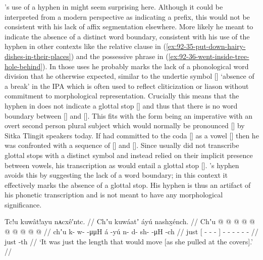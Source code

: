 \citeauthor{swanton:1909}’s use of a hyphen in  might seem surprising here.
Although it could be interpreted from a modern perspective as indicating a prefix, this would not be consistent with his lack of affix segmentation elsewhere.
More likely he meant to indicate the absence of a distinct word boundary, consistent with his use of the hyphen in other contexts like
the relative clause in (\ref{ex:92-35-put-down-hairy-dishes-in-their-places})
and
the possessive phrase in (\ref{ex:92-36-went-inside-tree-hole-behind}).
In those uses he probably marks the lack of a phonological word division that he otherwise expected, similar to the undertie symbol [] ‘absence of a break’ in the IPA \parencite[23]{international-phonetic-association:1999} which is often used to reflect cliticization or liason without commitment to morphological representation.
Crucially this means that the hyphen in  does not indicate a glottal stop [] and thus that there is no word boundary between [] and [].
This fits with the form being an imperative with an overt second person plural subject  which would normally be pronounced [] by Sitka Tlingit speakers today.
If \citeauthor{swanton:1909} had committed to the coda [] as a vowel [] then he was confronted with a sequence of [] and [].
Since \citeauthor{swanton:1909} usually did not transcribe glottal stops with a distinct symbol and instead relied on their implicit presence between vowels, his transcription as  would entail a glottal stop [].
\citeauthor{swanton:1909}’s hyphen avoids this by suggesting the lack of a word boundary;
in this context it effectively marks the absence of a glottal stop.
His hyphen is thus an artifact of his phonetic transcription and is not meant to have any morphological significance.

\ex\label{ex:92-41-length-would-move}%
%
\begingl
	\glpreamble	Tc!u kuwât!ayu nᴀcxê′ntc. //
	\glpreamble	Chʼu kuwáatʼ áyú nashx̱énch. //
	\gla	Chʼu {}  @ {} @ {} @ {} @ {} {}  @ {}
		 @ {} @ {} @ {} @ {} @ {} //
	\glb	chʼu {} k- w-  -μμH {} {} á -yú
		n- d- sh-  -μH -ch //
	\glc	just {}[ - -  - \· {}]
		 -
		- - -  - - //
	\gld	just {}  {} {} {} -th {}  {}
		 {} {} {} {} {} //
	\glft	‘It was just the length that would move [as she pulled at the covers].’
		//
\endgl
\xe

